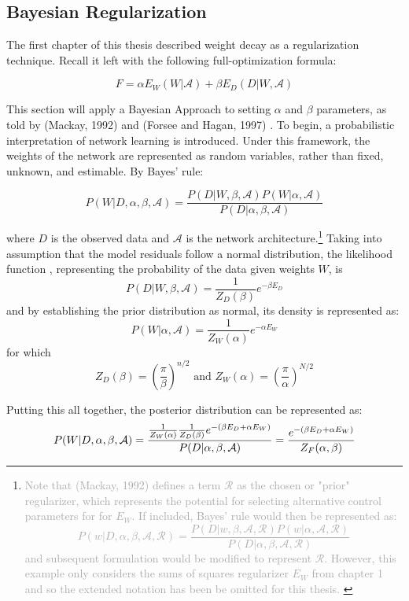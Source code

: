 \subsection{Bayesian Regularization}


The first chapter of this thesis described weight decay as a regularization technique.  Recall it left with the following full-optimization formula:

$$
F = \alpha E_W(W|\mathcal{A}) + \beta E_D(D|W,\mathcal{A})
$$



This section will apply a Bayesian Approach to setting $\alpha$ and $\beta$ parameters, as told by (Mackay, 1992) \cite{mackay1992practical} and (Forsee and Hagan, 1997) \cite{foresee1997gauss}.  To begin, a probabilistic interpretation of network learning \cite{mackay1992practical} is introduced.  Under this framework, the weights of the network are represented as random variables, rather than fixed, unknown, and estimable.  By Bayes' rule:
 
$$
P(W|D,\alpha,\beta,\mathcal{A}) = \frac{P(D|W,\beta,\mathcal{A}) P(W|\alpha,\mathcal{A})}{P(D|\alpha,\beta,\mathcal{A})}
$$

where $D$ is the observed data and $\mathcal{A}$ is the network architecture.\footnote{
\textcolor{darkgray}{
Note that (Mackay, 1992) defines a term $\mathcal{R}$ as the chosen or "prior" regularizer, which represents the potential for selecting alternative control parameters for for $E_W$.  If included, Bayes' rule would then be represented  as:
$$
P(w|D,\alpha,\beta,\mathcal{A},\mathcal{R}) = \frac{P(D|w,\beta,\mathcal{A},\mathcal{R}) P(w|\alpha,\mathcal{A},\mathcal{R})}{P(D|\alpha,\beta,\mathcal{A},\mathcal{R})}
$$
 and subsequent formulation would be modified to represent $\mathcal{R}$. However, this example only considers the sums of squares regularizer $E_W$ from chapter 1 and so the extended notation has been be omitted for this thesis.
 }}
Taking into assumption that the model residuals follow a normal distribution, the likelihood function \cite{foresee1997gauss}, representing the probability of the data given weights $W$, is
$$
P(D|W,\beta,\mathcal{A}) = \frac{1}{Z_D(\beta)} e^{-\beta E_D}
$$
and by establishing the prior distribution as normal, its density is represented as:
$$
P(W|\alpha,\mathcal{A}) = \frac{1}{Z_W(\alpha)} e^{-\alpha E_W}
$$
for which
$$
Z_D(\beta) = \left( \frac{\pi}{\beta} \right) ^{n/2} \text{ and }
Z_W(\alpha) = \left( \frac{\pi}{\alpha} \right) ^{N/2}
$$

Putting this all together, the posterior distribution can be represented as:
$$
P(W|D,\alpha,\beta,\mathcal{A}) = \frac{\frac{1}{Z_W(\alpha)} \frac{1}{Z_D(\beta)} e^{-(\beta E_D + \alpha E_W)}}{P(D|\alpha,\beta,\mathcal{A})} \\
= \frac{e^{-(\beta E_D + \alpha E_W)}}{Z_F(\alpha,\beta)}
$$

